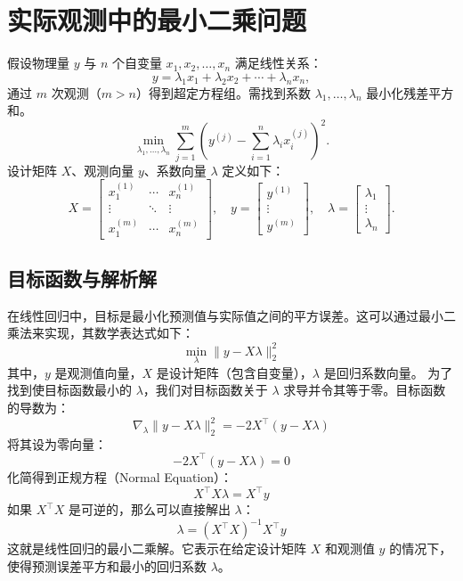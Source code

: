 \documentclass[lang=cn,11pt,a4paper]{elegantpaper}
\begin{document}
\section{实际观测中的最小二乘问题}
假设物理量 \( y \) 与 \( n \) 个自变量 \( x_1, x_2, \dots, x_n \) 满足线性关系：
\begin{equation}
y = \lambda_1 x_1 + \lambda_2 x_2 + \cdots + \lambda_n x_n,
\end{equation}
通过 \( m \) 次观测（\( m > n \)）得到超定方程组。需找到系数 \( \lambda_1, \dots, \lambda_n \) 最小化残差平方和。
\begin{equation}
\min_{\lambda_1, \dots, \lambda_n} \sum_{j=1}^m \left( y^{(j)} - \sum_{i=1}^n \lambda_i x_i^{(j)} \right)^2.
\end{equation}
设计矩阵 \( X \)、观测向量 \( y \)、系数向量 \( \lambda \) 定义如下：
\[
X = \begin{bmatrix}
x_1^{(1)} & \cdots & x_n^{(1)} \\
\vdots & \ddots & \vdots \\
x_1^{(m)} & \cdots & x_n^{(m)}
\end{bmatrix},\quad
y = \begin{bmatrix} y^{(1)} \\ \vdots \\ y^{(m)} \end{bmatrix},\quad
\lambda = \begin{bmatrix} \lambda_1 \\ \vdots \\ \lambda_n \end{bmatrix}.
\]
\subsection{目标函数与解析解}
在线性回归中，目标是最小化预测值与实际值之间的平方误差。这可以通过最小二乘法来实现，其数学表达式如下：
\begin{equation}
\min_{\lambda} \| y - X \lambda \|_2^2
\end{equation}
其中，\( y \) 是观测值向量，\( X \) 是设计矩阵（包含自变量），\( \lambda \) 是回归系数向量。
为了找到使目标函数最小的 \( \lambda \)，我们对目标函数关于 \( \lambda \) 求导并令其等于零。目标函数的导数为：
\begin{equation}
\nabla_{\lambda} \| y - X \lambda \|_2^2 = -2 X^\top (y - X \lambda)
\end{equation}
将其设为零向量：
\begin{equation}
-2 X^\top (y - X \lambda) = 0
\end{equation}
化简得到正规方程（Normal Equation）：
\begin{equation}
X^\top X \lambda = X^\top y
\end{equation}
如果 \( X^\top X \) 是可逆的，那么可以直接解出 \( \lambda \)：
\begin{equation}
\lambda = (X^\top X)^{-1} X^\top y
\end{equation}
这就是线性回归的最小二乘解。它表示在给定设计矩阵 \( X \) 和观测值 \( y \) 的情况下，使得预测误差平方和最小的回归系数 \( \lambda \)。
\end{document}
